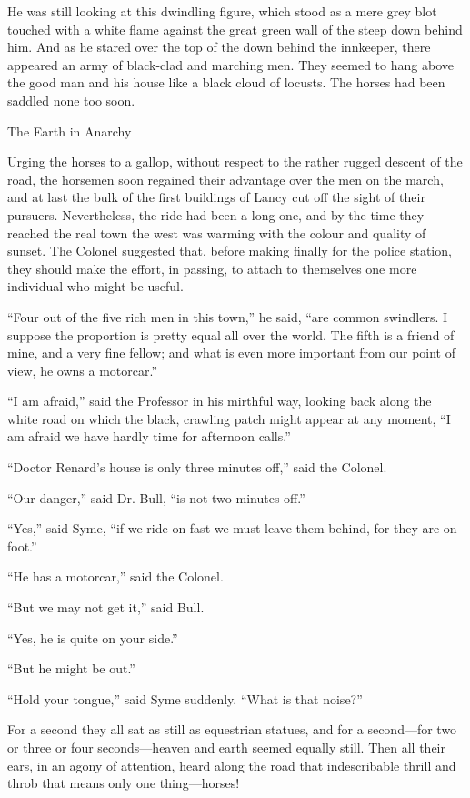 He was still looking at this dwindling figure, which stood as a mere grey blot touched with a white flame against the great green wall of the steep down behind him. And as he stared over the top of the down behind the innkeeper, there appeared an army of black-clad and marching men. They seemed to hang above the good man and his house like a black cloud of locusts. The horses had been saddled none too soon.

\chap The Earth in Anarchy

Urging the horses to a gallop, without respect to the rather rugged descent of the road, the horsemen soon regained their advantage over the men on the march, and at last the bulk of the first buildings of Lancy cut off the sight of their pursuers. Nevertheless, the ride had been a long one, and by the time they reached the real town the west was warming with the colour and quality of sunset. The Colonel suggested that, before making finally for the police station, they should make the effort, in passing, to attach to themselves one more individual who might be useful.

“Four out of the five rich men in this town,” he said, “are common swindlers. I suppose the proportion is pretty equal all over the world. The fifth is a friend of mine, and a very fine fellow; and what is even more important from our point of view, he owns a motorcar.”

“I am afraid,” said the Professor in his mirthful way, looking back along the white road on which the black, crawling patch might appear at any moment, “I am afraid we have hardly time for afternoon calls.”

“Doctor Renard’s house is only three minutes off,” said the Colonel.

“Our danger,” said Dr. Bull, “is not two minutes off.”

“Yes,” said Syme, “if we ride on fast we must leave them behind, for they are on foot.”

“He has a motorcar,” said the Colonel.

“But we may not get it,” said Bull.

“Yes, he is quite on your side.”

“But he might be out.”

“Hold your tongue,” said Syme suddenly. “What is that noise?”

For a second they all sat as still as equestrian statues, and for a second⁠—for two or three or four seconds⁠—heaven and earth seemed equally still. Then all their ears, in an agony of attention, heard along the road that indescribable thrill and throb that means only one thing⁠—horses!

